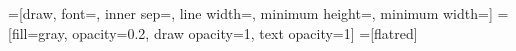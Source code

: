 \newlength{\logentryinnersep}
\setlength{\logentryinnersep}{2pt}
\newlength{\logentrylinewidth}
\setlength{\logentrylinewidth}{1pt}
\newlength{\logentrywidth}
\newcommand{\logindexcolor}{flatred}
\newcommand{\cmdi}{$a \gets 0$}
\newcommand{\cmdii}{$b \gets 0$}
\newcommand{\cmdiii}{$a \gets b$}

=[draw,
                      font=\scriptsize,
                      inner sep=\logentryinnersep,
                      line width=\logentrylinewidth,
                      minimum height=\logentrywidth,
                      minimum width=\logentrywidth]
=[fill=gray, opacity=0.2, draw opacity=1, text opacity=1]
=[\logindexcolor]

\newcommand{\rightof}[1]{-\logentrylinewidth of #1}

\newcommand{\multipaxoslog}[6]{%
  \node[logentry, label={[logindex]90:0}, #2] (0) {#1};
  \node[logentry, label={[logindex]90:1}, right=\rightof{0}, #4] (1) {#3};
  \node[logentry, label={[logindex]90:2}, right=\rightof{1}, #6] (2) {#5};
}

